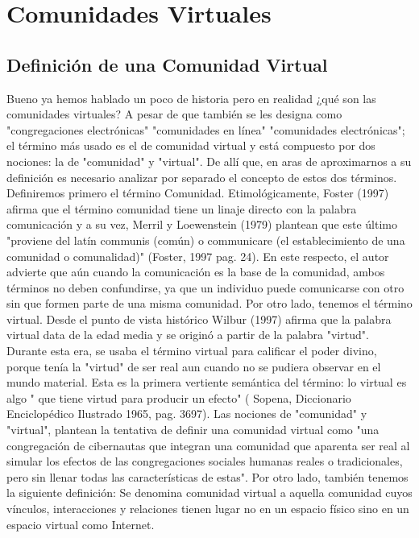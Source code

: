 
\chapter{Comunidades Virtuales} %

\label{ch:comunidades_virtuales} %


\section{Definición de una Comunidad Virtual}

Bueno ya hemos hablado un poco de historia pero en realidad ¿qué son las comunidades virtuales?
A pesar de que también se les designa como "congregaciones electrónicas" "comunidades en línea" "comunidades electrónicas"; el término más usado es el de comunidad virtual y está compuesto por dos nociones: la de "comunidad" y "virtual". De allí que, en aras de aproximarnos a su definición es necesario analizar por separado el concepto de estos dos términos.
Definiremos primero el término Comunidad.  Etimológicamente, Foster (1997) afirma que el término comunidad tiene un linaje directo con la palabra comunicación y a su vez, Merril y Loewenstein (1979) plantean que este último "proviene del latín communis (común) o communicare (el establecimiento de una comunidad o comunalidad)" (Foster, 1997 pag. 24). En este respecto, el autor advierte que aún cuando la comunicación es la base de la comunidad, ambos términos no deben confundirse, ya que un individuo puede comunicarse con otro sin que formen parte de una misma comunidad.
Por otro lado, tenemos el término virtual. Desde el punto de vista histórico Wilbur (1997) afirma que la palabra virtual data de la edad media y se originó a partir de la palabra "virtud". Durante esta era, se usaba el término virtual para calificar el poder divino, porque tenía la "virtud" de ser real aun cuando no se pudiera observar en el mundo material. Esta es la primera vertiente semántica del término: lo virtual es algo " que tiene virtud para producir un efecto" ( Sopena, Diccionario Enciclopédico Ilustrado 1965, pag. 3697).
Las nociones de "comunidad" y "virtual", plantean la tentativa de definir una comunidad virtual como "una congregación de cibernautas que integran una comunidad que aparenta ser real al simular los efectos de las congregaciones sociales humanas reales o tradicionales, pero sin llenar todas las características de estas".
Por otro lado, también tenemos la siguiente definición: Se denomina comunidad virtual a aquella comunidad cuyos vínculos, interacciones y relaciones tienen lugar no en un espacio físico sino en un espacio virtual como Internet.


